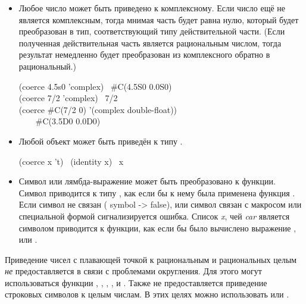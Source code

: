 \begin{defun}[Функция]
\begin{itemize}
  \begin{lisp}
    (coerce 0 'short-float) \EV\ 0.0S0 \\
    (coerce 3.5L0 'float) \EV\ 3.5L0 \\
    (coerce 7/2 'float) \EV\ 3.5
  \end{lisp}

\item
  Любое число может быть приведено к комплексному. Если число ещё не является
  комплексным, тогда мнимая часть будет равна нулю, который будет преобразован в
  тип, соответствующий типу действительной части. (Если полученная
  действительная часть является рациональным числом, тогда результат немедленно
  будет преобразован из комплексного обратно в рациональный.)

  \begin{lisp}
    (coerce 4.5s0 'complex) \EV\ \#C(4.5S0 0.0S0) \\
    (coerce 7/2 'complex) \EV\ 7/2 \\
    (coerce \#C(7/2 0) '(complex double-float)) \\
    ~~~\EV\ \#C(3.5D0 0.0D0)
  \end{lisp}

\item
  Любой объект может быть приведён к типу .
  \begin{lisp}
    (coerce x 't) \EQ\ (identity x) \EQ\ x
  \end{lisp}

\item
  Символ или лямбда-выражение может быть преобразовано к функции.
  Символ приводится к типу , как если бы к нему была применена
  функция . Если символ не связан ( symbol ->
  false), или символ связан с макросом или специальной формой сигнализируется
  ошибка.
  Список \emph{x}, чей \emph{car} является символом  приводится к
  функции, как если бы было вычислено выражение ,
  или .
\end{itemize}

Приведение чисел с плавающей точкой к рациональным и рациональных целым
\emph{не} предоставляется в связи с проблемами округления. Для этого могут
использоваться функции , ,
, ,  и . Также не предоставляется
приведение строковых символов к целым числам. В этих целях можно использовать
 или .
\end{defun}

